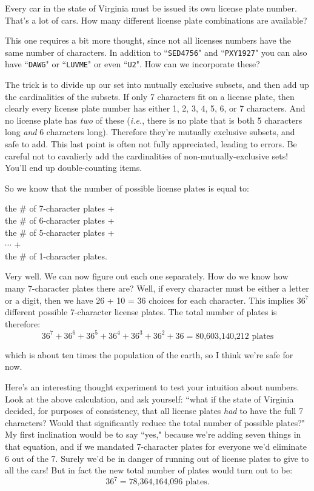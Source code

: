 \label{license plates}
Every car in the state of Virginia must be issued its own license plate
number. That's a lot of cars. How many different license plate combinations
are available?

This one requires a bit more thought, since not all licenses numbers have
the same number of characters. In addition to ``\texttt{SED4756}" and
``\texttt{PXY1927}" you can also have ``\texttt{DAWG}" or ``\texttt{LUVME}"
or even ``\texttt{U2}". How can we incorporate these?

The trick is to divide up our set into mutually exclusive subsets, and then
add up the cardinalities of the subsets. If only 7 characters fit on a
license plate, then clearly every license plate number has either 1, 2, 3,
4, 5, 6, or 7 characters. And no license plate has \textit{two} of these
(\textit{i.e.}, there is no plate that is both 5 characters long
\textit{and} 6 characters long). Therefore they're mutually exclusive
subsets, and safe to add. This last point is often not fully appreciated,
leading to errors. Be careful not to cavalierly add the cardinalities of
non-mutually-exclusive sets! You'll end up double-counting items.

So we know that the number of possible license plates is equal to:
\begin{center}
the \# of 7-character plates + \\
the \# of 6-character plates + \\
the \# of 5-character plates + \\
$\cdots$ + \\
the \# of 1-character plates.
\end{center}

Very well. We can now figure out each one separately. How do we know how
many 7-character plates there are? Well, if every character must be either
a letter or a digit, then we have 26 + 10 = 36 choices for each character.
This implies $36^7$ different possible 7-character license plates. The
total number of plates is therefore:
\[
36^7 + 36^6 + 36^5 + 36^4 + 36^3 + 36^2 + 36 = \text{80,603,140,212 plates}
\]

which is about ten times the population of the earth, so I think we're
safe for now.

Here's an interesting thought experiment to test your intuition about
numbers. Look at the above calculation, and ask yourself: ``what if the
state of Virginia decided, for purposes of consistency, that all license
plates \textit{had} to have the full 7 characters? Would that significantly
reduce the total number of possible plates?" My first inclination would be
to say ``yes," because we're adding seven things in that equation, and if
we mandated 7-character plates for everyone we'd eliminate 6 out of the 7.
Surely we'd be in danger of running out of license plates to give to all
the cars! But in fact the new total number of plates would turn out to be:
\[
36^7 = \text{78,364,164,096 plates}.
\]

